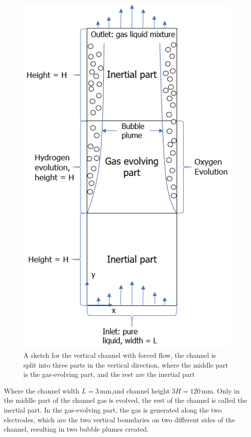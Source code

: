 \begin{figure}[H]
    \centering
    \includegraphics[scale=0.8]{sketchsquarechannel.png}
    \caption{A sketch for the vertical channel with forced flow, the channel is split into three parts in the vertical direction, where the middle part is the gas-evolving part, and the rest are the inertial part}
    \label{vertical}
\end{figure}

Where the channel width $L = 3 \, \mathrm{mm}$,and channel height $3H = 120  \, \mathrm{mm}$. Only in the middle part of the channel gas is evolved, the rest of the channel is called the inertial part. In the gas-evolving part, the gas is generated along the two electrodes, which are the two vertical boundaries on two different sides of the channel, resulting in two bubble plumes created. 

